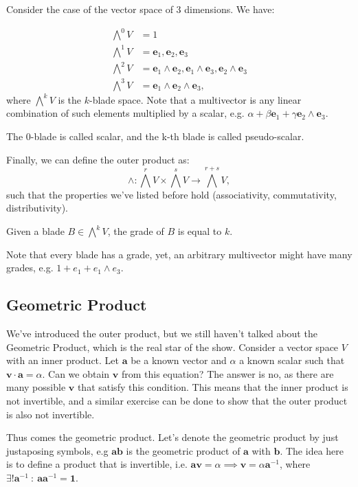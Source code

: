 Consider the case of the vector space of 3 dimensions. We have:

\begin{align*}
    \bigwedge^0 V &= 1 \\
    \bigwedge^1 V &= \mathbf e_1, \mathbf e_2, \mathbf e_3\\
    \bigwedge^2 V &= \mathbf e_1\wedge \mathbf e_2, \mathbf e_1 \wedge \mathbf e_3, \mathbf e_2 \wedge \mathbf e_3 \\
    \bigwedge^3 V &= \mathbf e_1\wedge \mathbf e_2 \wedge \mathbf e_3,
\end{align*}
where $\bigwedge^k V$ is the $k$-blade space. Note that a multivector is any linear combination of such elements multiplied by a scalar, e.g.
$\alpha + \beta \mathbf e_1 + \gamma \mathbf e_2 \wedge \mathbf e_3$.

The $0$-blade is called scalar, and the k-th blade is called pseudo-scalar.

Finally, we can define the outer product as:
$$
\wedge : \bigwedge^r V \times \bigwedge^s V \to \bigwedge^{r + s} V,
$$
such that the properties we've listed before hold (associativity, commutativity, distributivity).

\begin{definition}[Grade]
    Given a blade $B \in \bigwedge^k V$, the grade of $B$ is equal to $k$.
\end{definition}

Note that every blade has a grade, yet, an arbitrary multivector might have many grades, e.g. $1 + e_1 + e_1\wedge e_3$.

\subsection{Geometric Product}

We've introduced the outer product, but we still haven't talked about the Geometric Product, which is the real star of the show.
Consider a vector space $V$ with an inner product.
Let $\mathbf a$ be a known vector and $\alpha$ a known scalar such that $\mathbf v \cdot \mathbf a = \alpha$. Can we obtain
$\mathbf v$ from this equation? The answer is no, as there are many possible $\mathbf v$ that satisfy this condition. This
means that the inner product is not invertible, and a similar exercise can be done to show that the outer product
is also not invertible.

Thus comes the geometric product. Let's denote the geometric product by just justaposing
symbols, e.g $\mathbf a \mathbf b$ is the geometric product of $\mathbf a$ with $\mathbf b$.
The idea here is to define a product that is invertible, i.e.
$\mathbf a  \mathbf v = \alpha \implies \mathbf v = \alpha  \mathbf a^{-1}$, where $\exists! \mathbf a^{-1} \ : \ \mathbf a  \mathbf a^{-1} = \mathbf 1$.

